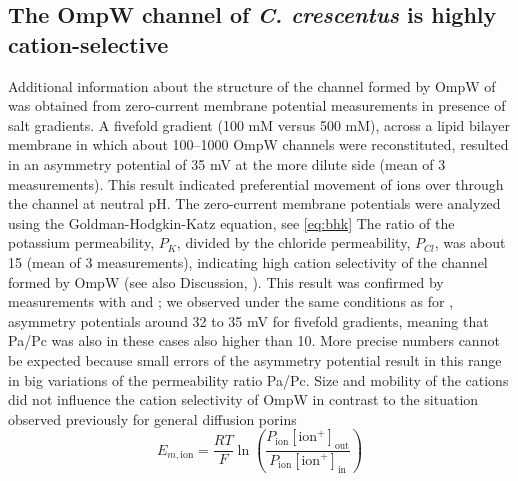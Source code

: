 \subsection{The OmpW channel of \textit{C. crescentus} is highly cation-selective}

Additional information about the structure of the channel formed by OmpW of \caulobacter was obtained from zero-current membrane potential measurements in presence of salt gradients. A fivefold  gradient (100 mM versus 500 mM), across a lipid bilayer membrane in which about 100--1000 OmpW channels were reconstituted, resulted in an asymmetry potential of 35 mV at the more dilute side (mean of 3 measurements). This result indicated preferential movement of  ions over  through the channel at neutral pH. The zero-current membrane potentials were analyzed using the Goldman-Hodgkin-Katz equation, see \cref{eq:bhk} The ratio of the potassium permeability, $P_K$, divided by the chloride permeability, $P_{Cl}$, was about 15 (mean of 3 measurements), indicating high cation selectivity of the channel formed by OmpW (see also Discussion, ). This result was confirmed by measurements with  and ; we observed under the same conditions as for , asymmetry potentials around 32 to 35 mV for fivefold gradients, meaning that Pa/Pc was also in these cases also higher than 10. More precise numbers cannot be expected because small errors of the asymmetry potential result in this range in big variations of the permeability ratio Pa/Pc. Size and mobility of the cations did not influence the cation selectivity of OmpW in contrast to the situation observed previously for general diffusion porins
\begin{equation} \label{eq:bhk}
  E_{m,\text{ion}} = \frac{RT}{F} \ln{ \left( \frac{ P_{\text{ion}}[\text{ion}^{+}]_\mathrm{out}}{ P_{\text{ion}}[\text{ion}^{+}]_\mathrm{in}} \right) }
\end{equation}

